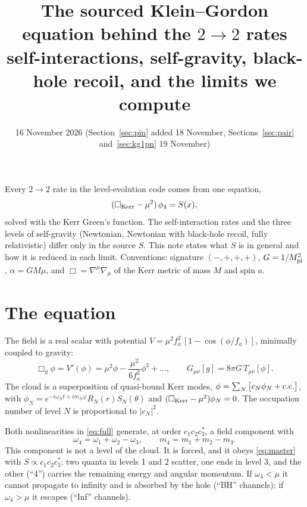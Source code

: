 \documentclass[11pt]{article}
\title{\textbf{The sourced Klein--Gordon equation behind the $2\to2$ rates}\\[3pt]
\large self-interactions, self-gravity, black-hole recoil, and the limits we compute}
\author{}
\date{16 November 2026 (Section~\ref{sec:pin} added 18 November, Sections~\ref{sec:pair} and~\ref{sec:kg1pn} 19 November)}
\newcommand{\Mpl}{M_{\rm pl}}
\newcommand{\BoxK}{\Box_{\rm Kerr}}
\begin{document}
\maketitle

\noindent
Every $2\to2$ rate in the level-evolution code comes from one equation,
\begin{equation}
(\BoxK-\mu^2)\,\phi_4 = S(x), \label{eq:master}
\end{equation}
solved with the Kerr Green's function. The self-interaction rates and the three levels of self-gravity
(Newtonian, Newtonian with black-hole recoil, fully relativistic) differ only in the source $S$.
This note states what $S$ is in general and how it is reduced in each limit.
Conventions: signature $(-,+,+,+)$, $G=1/\Mpl^2$, $\alpha=GM\mu$, and $\Box=\nabla^\mu\nabla_\mu$ of the Kerr metric of mass $M$ and spin $a$.

\section{The equation}

The field is a real scalar with potential $V=\mu^2f_a^2\,[1-\cos(\phi/f_a)]$, minimally coupled to gravity:
\begin{equation}
\Box_g\phi = V'(\phi)=\mu^2\phi-\frac{\mu^2}{6f_a^2}\phi^3+\dots,\qquad G_{\mu\nu}[g]=8\pi G\,T_{\mu\nu}[\phi]. \label{eq:full}
\end{equation}
The cloud is a superposition of quasi-bound Kerr modes,
$\phi=\sum_N\big[c_N\phi_N+{\rm c.c.}\big]$, with $\phi_N=e^{-i\omega_Nt+im_N\varphi}R_N(r)S_N(\theta)$ and
$(\BoxK-\mu^2)\phi_N=0$. The occupation number of level $N$ is proportional to $|c_N|^2$.

Both nonlinearities in \eqref{eq:full} generate, at order $c_1c_2c_3^*$, a field component with
\begin{equation}
\omega_4=\omega_1+\omega_2-\omega_3,\qquad m_4=m_1+m_2-m_3 .
\end{equation}
This component is not a level of the cloud. It is forced, and it obeys \eqref{eq:master} with $S\propto c_1c_2c_3^*$:
two quanta in levels 1 and 2 scatter, one ends in level 3, and the other (``4'') carries the remaining energy and angular momentum.
If $\omega_4<\mu$ it cannot propagate to infinity and is absorbed by the hole (``BH'' channels); if $\omega_4>\mu$ it escapes (``Inf'' channels).
\end{document}
